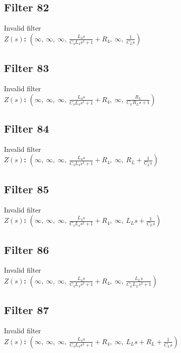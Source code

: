 \documentclass{article}
\begin{document}
\subsection*{Filter 82}
Invalid filter \\ 
\textbf{$Z(s)$:} $\left( \infty, \  \infty, \  \infty, \  \frac{L_{4} s}{C_{4} L_{4} s^{2} + 1} + R_{4}, \  \infty, \  \frac{1}{C_{L} s}\right)$ \\ 
\subsection*{Filter 83}
Invalid filter \\ 
\textbf{$Z(s)$:} $\left( \infty, \  \infty, \  \infty, \  \frac{L_{4} s}{C_{4} L_{4} s^{2} + 1} + R_{4}, \  \infty, \  \frac{R_{L}}{C_{L} R_{L} s + 1}\right)$ \\ 
\subsection*{Filter 84}
Invalid filter \\ 
\textbf{$Z(s)$:} $\left( \infty, \  \infty, \  \infty, \  \frac{L_{4} s}{C_{4} L_{4} s^{2} + 1} + R_{4}, \  \infty, \  R_{L} + \frac{1}{C_{L} s}\right)$ \\ 
\subsection*{Filter 85}
Invalid filter \\ 
\textbf{$Z(s)$:} $\left( \infty, \  \infty, \  \infty, \  \frac{L_{4} s}{C_{4} L_{4} s^{2} + 1} + R_{4}, \  \infty, \  L_{L} s + \frac{1}{C_{L} s}\right)$ \\ 
\subsection*{Filter 86}
Invalid filter \\ 
\textbf{$Z(s)$:} $\left( \infty, \  \infty, \  \infty, \  \frac{L_{4} s}{C_{4} L_{4} s^{2} + 1} + R_{4}, \  \infty, \  \frac{L_{L} s}{C_{L} L_{L} s^{2} + 1}\right)$ \\ 
\subsection*{Filter 87}
Invalid filter \\ 
\textbf{$Z(s)$:} $\left( \infty, \  \infty, \  \infty, \  \frac{L_{4} s}{C_{4} L_{4} s^{2} + 1} + R_{4}, \  \infty, \  L_{L} s + R_{L} + \frac{1}{C_{L} s}\right)$ \\ 
\end{document}
